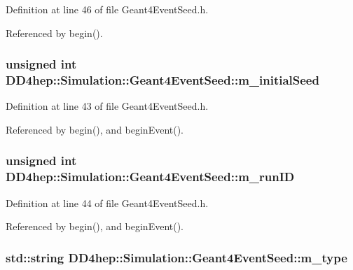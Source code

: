Definition at line 46 of file Geant4EventSeed.h.

Referenced by begin().\hypertarget{class_d_d4hep_1_1_simulation_1_1_geant4_event_seed_aad2e0264889e33271d97832966d516b0}{
\subsubsection[{m\_\-initialSeed}]{\setlength{\rightskip}{0pt plus 5cm}unsigned int {\bf DD4hep::Simulation::Geant4EventSeed::m\_\-initialSeed}}}
\label{class_d_d4hep_1_1_simulation_1_1_geant4_event_seed_aad2e0264889e33271d97832966d516b0}


Definition at line 43 of file Geant4EventSeed.h.

Referenced by begin(), and beginEvent().\hypertarget{class_d_d4hep_1_1_simulation_1_1_geant4_event_seed_a0810bca4809cd7a1293ed324cb427daa}{
\subsubsection[{m\_\-runID}]{\setlength{\rightskip}{0pt plus 5cm}unsigned int {\bf DD4hep::Simulation::Geant4EventSeed::m\_\-runID}}}
\label{class_d_d4hep_1_1_simulation_1_1_geant4_event_seed_a0810bca4809cd7a1293ed324cb427daa}


Definition at line 44 of file Geant4EventSeed.h.

Referenced by begin(), and beginEvent().\hypertarget{class_d_d4hep_1_1_simulation_1_1_geant4_event_seed_ae04ac0bb4801305fa677c4f4bce1a1ea}{
\subsubsection[{m\_\-type}]{\setlength{\rightskip}{0pt plus 5cm}std::string {\bf DD4hep::Simulation::Geant4EventSeed::m\_\-type}}}
\label{class_d_d4hep_1_1_simulation_1_1_geant4_event_seed_ae04ac0bb4801305fa677c4f4bce1a1ea}



